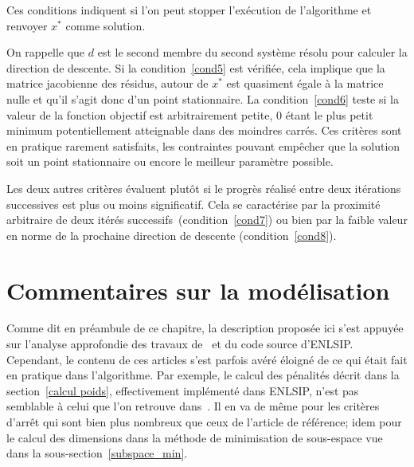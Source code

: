 Ces conditions indiquent si l'on peut stopper l'exécution de l'algorithme et renvoyer $x^*$ comme solution.

On rappelle que $d$ est le second membre du second système résolu pour calculer la direction de descente. Si la condition~\eqref{cond5} est vérifiée, cela implique que 
la matrice jacobienne des résidus, autour de $x^*$ est quasiment égale à la matrice nulle et qu'il s'agit donc d'un point stationnaire. La condition~\eqref{cond6} teste si 
la valeur de la fonction objectif est arbitrairement petite, 0 étant le plus petit minimum potentiellement atteignable dans des moindres carrés. 
Ces critères sont en pratique rarement satisfaits, les contraintes pouvant empêcher que la solution soit un point stationnaire ou encore le meilleur paramètre possible.

 Les deux autres critères évaluent plutôt si le progrès réalisé entre deux itérations successives est plus ou moins significatif. Cela se caractérise par la 
 proximité arbitraire de deux itérés successifs~(condition~\eqref{cond7}) ou bien par la faible valeur en norme de la prochaine direction de descente (condition~\eqref{cond8}).

 \section{Commentaires sur la modélisation}

Comme dit en préambule de ce chapitre, la description proposée ici s'est appuyée sur l'analyse approfondie des travaux de~\citet{lindstromwedin1984,lindwedin88}
et du code source d'ENLSIP. Cependant, le contenu de ces articles s'est parfois avéré éloigné de ce qui était fait en pratique dans l'algorithme. Par exemple,
le calcul des pénalités décrit dans la section~\ref{calcul poids}, effectivement implémenté dans ENLSIP, n'est pas semblable à celui que l'on retrouve dans~\cite{lindwedin88}.
Il en va de même pour les critères d'arrêt qui sont bien plus nombreux que ceux de l'article de référence; idem pour le calcul des dimensions dans la méthode de 
minimisation de sous-espace vue dans la sous-section~\ref{subspace_min}.